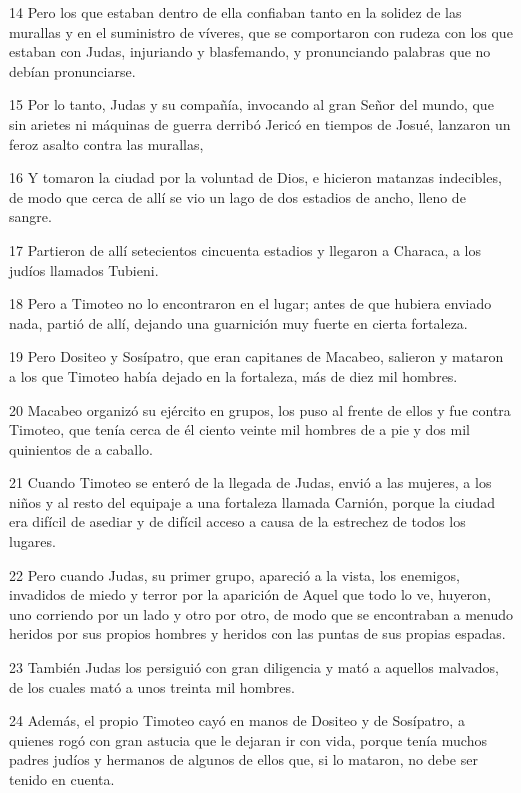 \par 14 Pero los que estaban dentro de ella confiaban tanto en la solidez de las murallas y en el suministro de víveres, que se comportaron con rudeza con los que estaban con Judas, injuriando y blasfemando, y pronunciando palabras que no debían pronunciarse.
\par 15 Por lo tanto, Judas y su compañía, invocando al gran Señor del mundo, que sin arietes ni máquinas de guerra derribó Jericó en tiempos de Josué, lanzaron un feroz asalto contra las murallas,
\par 16 Y tomaron la ciudad por la voluntad de Dios, e hicieron matanzas indecibles, de modo que cerca de allí se vio un lago de dos estadios de ancho, lleno de sangre.
\par 17 Partieron de allí setecientos cincuenta estadios y llegaron a Characa, a los judíos llamados Tubieni.
\par 18 Pero a Timoteo no lo encontraron en el lugar; antes de que hubiera enviado nada, partió de allí, dejando una guarnición muy fuerte en cierta fortaleza.
\par 19 Pero Dositeo y Sosípatro, que eran capitanes de Macabeo, salieron y mataron a los que Timoteo había dejado en la fortaleza, más de diez mil hombres.
\par 20 Macabeo organizó su ejército en grupos, los puso al frente de ellos y fue contra Timoteo, que tenía cerca de él ciento veinte mil hombres de a pie y dos mil quinientos de a caballo.
\par 21 Cuando Timoteo se enteró de la llegada de Judas, envió a las mujeres, a los niños y al resto del equipaje a una fortaleza llamada Carnión, porque la ciudad era difícil de asediar y de difícil acceso a causa de la estrechez de todos los lugares.
\par 22 Pero cuando Judas, su primer grupo, apareció a la vista, los enemigos, invadidos de miedo y terror por la aparición de Aquel que todo lo ve, huyeron, uno corriendo por un lado y otro por otro, de modo que se encontraban a menudo heridos por sus propios hombres y heridos con las puntas de sus propias espadas.
\par 23 También Judas los persiguió con gran diligencia y mató a aquellos malvados, de los cuales mató a unos treinta mil hombres.
\par 24 Además, el propio Timoteo cayó en manos de Dositeo y de Sosípatro, a quienes rogó con gran astucia que le dejaran ir con vida, porque tenía muchos padres judíos y hermanos de algunos de ellos que, si lo mataron, no debe ser tenido en cuenta.
